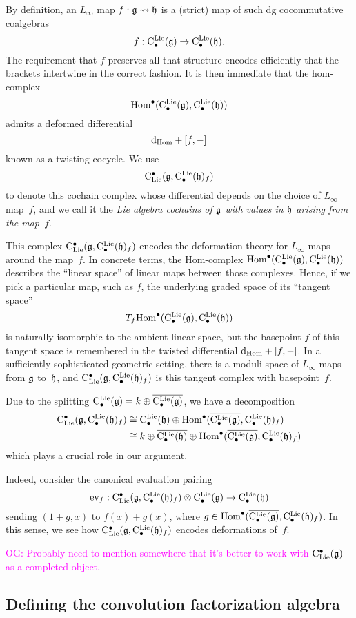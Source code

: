 \documentclass[11pt]{amsart}
\numberwithin{equation}{section}
\def\owen{\textcolor{magenta}{OG: }\textcolor{magenta}}
\begin{document}
By definition, an $L_\infty$ map $f: \mathfrak g \rightsquigarrow \mathfrak h$ is a (strict) map of such dg cocommutative coalgebras
\[
f: {\rm C}^{\rm Lie}_\bullet(\mathfrak g) \to {\rm C}^{\rm Lie}_\bullet(\mathfrak h).
\]
The requirement that $f$ preserves all that structure encodes efficiently that the brackets intertwine in the correct fashion.
It is then immediate that the hom-complex
\[
{\rm Hom}^\bullet ({\rm C}^{\rm Lie}_\bullet(\mathfrak g), {\rm C}^{\rm Lie}_\bullet(\mathfrak h))
\]
admits a deformed differential
\[
{\rm d}_{\rm Hom} + [f,-]
\]
known as a twisting cocycle.
We use 
\[
{\rm C}_{\rm Lie}^\bullet(\mathfrak g,{\rm C}^{\rm Lie}_\bullet(\mathfrak h)_f)
\]
to denote this cochain complex whose differential depends on the choice of $L_\infty$ map~$f$,
and we call it the {\em Lie algebra cochains of $\mathfrak g$ with values in $\mathfrak h$ arising from the map~$f$}.

This complex ${\rm C}_{\rm Lie}^\bullet(\mathfrak g,{\rm C}^{\rm Lie}_\bullet(\mathfrak h)_f)$ encodes the deformation theory for $L_\infty$ maps around the map~$f$.
In concrete terms, the Hom-complex ${\rm Hom}^\bullet ({\rm C}^{\rm Lie}_\bullet(\mathfrak g), {\rm C}^{\rm Lie}_\bullet(\mathfrak h))$ describes the ``linear space'' of linear maps between those complexes.
Hence, if we pick a particular map, such as $f$, the underlying graded space of its ``tangent space''
\[
T_f {\rm Hom}^\bullet ({\rm C}^{\rm Lie}_\bullet(\mathfrak g), {\rm C}^{\rm Lie}_\bullet(\mathfrak h))
\]
is naturally isomorphic to the ambient linear space,
but the basepoint $f$ of this tangent space is remembered in the twisted differential ${\rm d}_{\rm Hom} + [f,-]$.
In a sufficiently sophisticated geometric setting, there is a moduli space of $L_\infty$ maps from $\mathfrak g$ to~$\mathfrak h$,
and ${\rm C}_{\rm Lie}^\bullet(\mathfrak g,{\rm C}^{\rm Lie}_\bullet(\mathfrak h)_f)$ is this tangent complex with basepoint~$f$.

Due to the splitting ${\rm C}^{\rm Lie}_\bullet(\mathfrak g) = k \oplus \overline{{\rm C}^{\rm Lie}_\bullet(\mathfrak g)}$,
we have a decomposition
\begin{align*}
{\rm C}_{\rm Lie}^\bullet(\mathfrak g,{\rm C}^{\rm Lie}_\bullet(\mathfrak h)_f) 
&\cong {\rm C}^{\rm Lie}_\bullet(\mathfrak h) \oplus {\rm Hom}^\bullet(\overline{{\rm C}^{\rm Lie}_\bullet(\mathfrak g)}, {\rm C}^{\rm Lie}_\bullet(\mathfrak h)_f)\\
&\cong k \oplus \overline{{\rm C}^{\rm Lie}_\bullet(\mathfrak h)} \oplus {\rm Hom}^\bullet(\overline{{\rm C}^{\rm Lie}_\bullet(\mathfrak g)}, {\rm C}^{\rm Lie}_\bullet(\mathfrak h)_f)
\end{align*}
which plays a crucial role in our argument.

Indeed, consider the canonical evaluation pairing
\[
{\rm ev}_{f}: {\rm C}_{\rm Lie}^\bullet(\mathfrak g,{\rm C}^{\rm Lie}_\bullet(\mathfrak h)_f) \otimes {\rm C}^{\rm Lie}_\bullet(\mathfrak g) \to {\rm C}^{\rm Lie}_\bullet(\mathfrak h)
\]
sending $(1 + g, x)$ to $f(x) + g(x)$, where $g \in {\rm Hom}^\bullet(\overline{{\rm C}^{\rm Lie}_\bullet(\mathfrak g)}, {\rm C}^{\rm Lie}_\bullet(\mathfrak h)_f)$.
In this sense, we see how ${\rm C}_{\rm Lie}^\bullet(\mathfrak g,{\rm C}^{\rm Lie}_\bullet(\mathfrak h)_f)$ encodes deformations of~$f$.

\owen{Probably need to mention somewhere that it's better to work with ${\rm C}_{\rm Lie}^\bullet(\mathfrak g)$ as a completed object.}

\subsection{Defining the convolution factorization algebra}
\label{sec: dfn of centralizer fact alg}
\end{document}
